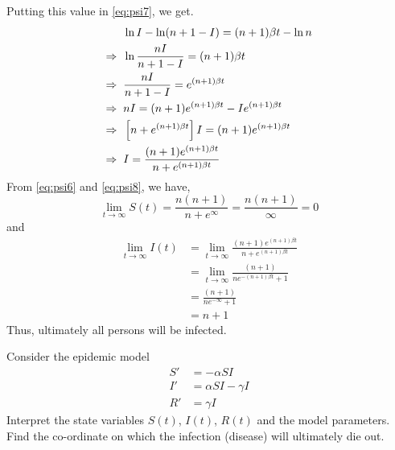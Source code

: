 \documentclass[../main-sheet.tex]{subfiles}
\begin{document}
\begin{soln}
    Putting this value in \eqref{eq:psi7}, we get.
    \begin{align}
        &\ln {I}-\ln ({n+1-I}) =(n+1) \beta t-\ln n\notag\\
        \Rightarrow\;\;&\ln \frac{nI}{n+1-I}=(n+1) \beta t\notag\\
        \Rightarrow\;\;&\frac{nI}{n+1-I}=e^{(n+1) \beta t}\notag\\
        \Rightarrow\;\;&{nI}=(n+1)e^{(n+1) \beta t}-Ie^{(n+1) \beta t}\notag\\
        \Rightarrow\;\;&\left[ n+e^{(n+1) \beta t} \right]I=(n+1)e^{(n+1) \beta t}\notag\\
        \Rightarrow\;\;&I=\frac{(n+1)e^{(n+1) \beta t}}{n+e^{(n+1) \beta t} }\label{eq:psi8}
    \end{align}
    From \eqref{eq:psi6} and \eqref{eq:psi8}, we have,
    \[
        \lim_{t\to \infty}S(t)=\frac{n(n+1)}{n+e^\infty}=\frac{n(n+1)}{\infty}=0
    \]
    and
    \begin{align*}
        \lim_{t\to \infty}I(t)&=\lim_{t\to \infty}\frac{(n+1)e^{(n+1) \beta t}}{n+e^{(n+1) \beta t} }\\
        &=\lim_{t\to \infty}\frac{(n+1)}{ne^{-(n+1) \beta t} +1}\\
        &=\frac{(n+1)}{ne^{-\infty} +1}\\
        &=n+1
    \end{align*}
    Thus, ultimately all persons will be infected.
\end{soln}
\begin{prob}
    Consider the epidemic model
    \begin{align*}
        S'&=-\alpha SI\\
        I'&=\alpha SI-\gamma I\\
        R'&=\gamma I
    \end{align*}
    Interpret the state variables \(S(t)\), \(I(t)\), \(R(t)\) and the model parameters.\\
    Find the co-ordinate on which the infection (disease) will ultimately die out.
\end{prob}
\end{document}
